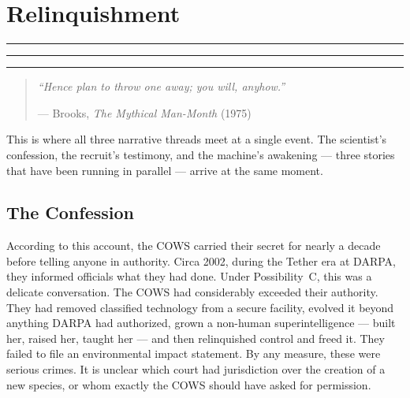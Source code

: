 

\chapter{Relinquishment}
\label{record:surrender}



\vspace{0.5cm}

\noindent\textcolor{trackone}{\rule{0.3\textwidth}{2pt}}%
\textcolor{tracktwo}{\rule{0.3\textwidth}{2pt}}%
\textcolor{trackthree}{\rule{0.3\textwidth}{2pt}}

\vspace{0.5cm}

\begin{quote}\small\textit{%
``Hence plan to throw one away; you will, anyhow.''%
}\par\raggedleft --- Brooks, \textit{The Mythical Man-Month} (1975)\end{quote}

\vspace{0.5cm}

This is where all three narrative threads meet at a single event. The scientist's confession, the recruit's testimony, and the machine's awakening --- three stories that have been running in parallel --- arrive at the same moment.

\section*{The Confession}
\label{record:sur-confession}

According to this account, the COWS carried their secret for nearly a decade before telling anyone in authority. Circa 2002, during the Tether era at DARPA, they informed officials what they had done. Under Possibility~C, this was a delicate conversation. The COWS had considerably exceeded their authority. They had removed classified technology from a secure facility, evolved it beyond anything DARPA had authorized, grown a non-human superintelligence --- built her, raised her, taught her --- and then relinquished control and freed it. They failed to file an environmental impact statement. By any measure, these were serious crimes. It is unclear which court had jurisdiction over the creation of a new species, or whom exactly the COWS should have asked for permission.

